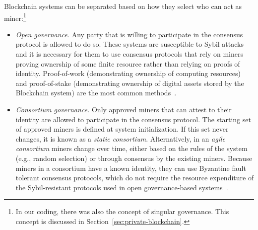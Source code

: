 
Blockchain systems can be separated based on how they select who can act as miner:\footnote{In our coding, there was also the concept of singular governance. This concept is discussed in Section~\ref{sec:private-blockchain}.}

\begin{itemize}
	\item \emph{Open governance.}
	Any party that is willing to participate in the consensus protocol is allowed to do so.
	These systems are susceptible to Sybil attacks and it is necessary for them to use consensus protocols that rely on miners proving ownership of some finite resource rather than relying on proofs of identity.
	Proof-of-work (demonstrating ownership of computing resources) and proof-of-stake (demonstrating ownership of digital assets stored by the Blockchain system) are the most common methods~\cite{Bano17,garay2018consensus}.
	
	\item \emph{Consortium governance.}
	Only approved miners that can attest to their identity are allowed to participate in the consensus protocol.
	The starting set of approved miners is defined at system initialization.
	If this set never changes, it is known as a \emph{static consortium}.
	Alternatively, in an \emph{agile consortium} miners change over time, either based on the rules of the system (e.g., random selection) or through consensus by the existing miners.
	Because miners in a consortium have a known identity, they can use Byzantine fault tolerant consensus protocols, which do not require the resource expenditure of the Sybil-resistant protocols used in open governance-based systems~\cite{Bano17,garay2018consensus}.		
\end{itemize}

